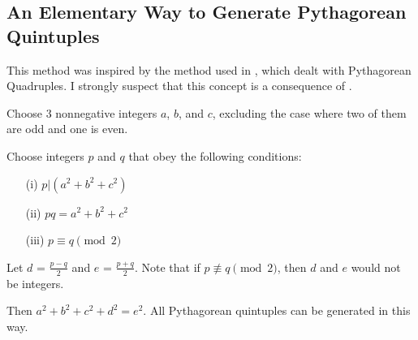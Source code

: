 \documentclass[12pt]{article}
\theoremstyle{definition}
\numberwithin{equation}{section}
\begin{document}
\begin{appendices}


\section{An Elementary Way to Generate Pythagorean Quintuples}
\label{appendix_elementary_way}

This method was inspired by the method used in \cite{New_Path}, which 
dealt with Pythagorean Quadruples. I strongly suspect that this concept
is a consequence of \cite{Formalized_New_Path}.


Choose 3 nonnegative integers $a$, $b$, and $c$, excluding the case 
where two of them are odd and one is even.





Choose integers $p$ and $q$ that obey the following 
conditions:


\begin{itemize}
\item[(i)]
$p|(a^2 + b^2 + c^2)$ 


\item[(ii)]
$pq = a^2 + b^2 + c^2$ 



\item[(iii)]
$p \equiv q \pmod 2$



\end{itemize}




Let $d$ = $\frac{p-q}{2}$ and
$e$ = $\frac{p+q}{2}$. 
Note that if $p \not\equiv q \pmod 2$, then $d$ and $e$
would not be integers.

Then $a^2 + b^2 + c^2 + d^2 = e^2$. All Pythagorean quintuples can 
be generated in this way.




\end{appendices}



\newpage

\newcommand{\journal}[6]{{\sc #1,} #2, {\it #3} {\bf #4} (#5), #6.}
\newcommand{\preprint}[3]{{\sc #1,} #2, preprint #3.}
\newcommand{\book}[4]{{\sc #1,} #2, #3, #4.}
\newcommand{\collection}[6]{{\sc #1,}  #2, #3, in {\it #4}, #5, #6.}
\newcommand{\JCTA}{J.\ Combin.\ Theory Ser.\ A}
\newcommand{\arxiv}[3]{{\sc #1,} #2, {\tt #3}.}
\newcommand{\article}[3]{{\sc #1,} #2, {\tt #3}.}
\newcommand{\journalfive}[5]{{\sc #1,} #2, {\it #3}  (#4), #5.}
\end{document}
